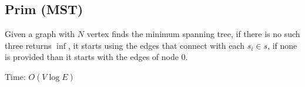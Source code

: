 \subsection{Prim (MST)}

Given a graph with $N$ vertex finds the minimum spanning tree, if there is no such three returns $\inf$, it starts using the edges that connect with each $s_i \in s$, if none is provided than it starts with the edges of node $0$.

Time: $O(V \log{E})$
